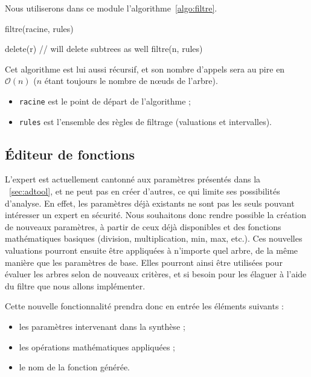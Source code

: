         Nous utiliserons dans ce module l'algorithme~\ref{algo:filtre}. 
        \begin{algorithm}[h!]
            \caption{filtre(racine, rules)}
            \label{algo:filtre}
            \begin{algorithmic}
                        \STATE delete(r) // will delete subtrees as well
                        \RETURN
                    \ENDIF
                \ENDFOR
                \STATE
                    \STATE filtre(n, rules)
                \ENDFOR
            \end{algorithmic}
        \end{algorithm}
        Cet algorithme est lui aussi récursif, et son nombre d'appels sera au pire en $\mathcal{O}(n)$ ($n$ étant toujours le nombre de nœuds de l'arbre).
        \begin{itemize}
            \item \verb|racine| est le point de départ de l'algorithme ;
            \item \verb|rules| est l'ensemble des règles de filtrage (valuations et intervalles).
        \end{itemize}
    
        \subsection{Éditeur de fonctions}
            \label{subsection:synthese} 

            L'expert est actuellement cantonné aux paramètres présentés dans la {}~\ref{sec:adtool}, et ne peut pas en créer d'autres, ce qui limite ses possibilités d'analyse. En effet, les paramètres déjà existants ne sont pas les seuls pouvant intéresser un expert en sécurité. Nous souhaitons donc rendre possible la création de nouveaux paramètres, à partir de ceux déjà disponibles et des fonctions mathématiques basiques (division, multiplication, min, max, etc.). Ces nouvelles valuations pourront ensuite être appliquées à n'importe quel arbre, de la même manière que les paramètres de base. Elles pourront ainsi être utilisées pour évaluer les arbres selon de nouveaux critères, et si besoin pour les élaguer à l'aide du filtre que nous allons implémenter.

            Cette nouvelle fonctionnalité prendra donc en entrée les éléments suivants :
            \begin{itemize}
                \item les paramètres intervenant dans la synthèse ;
                \item les opérations mathématiques appliquées ;
                \item le nom de la fonction générée.
            \end{itemize}

